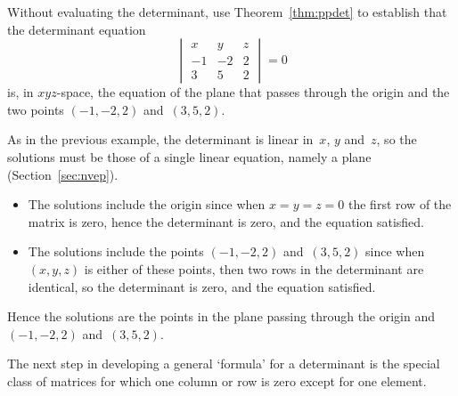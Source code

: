 \begin{example} \label{eg:planeq}
Without evaluating the determinant, use Theorem~\ref{thm:ppdet} to establish that the determinant equation
\begin{equation*}
\begin{vmatrix} x&y&z\\-1&-2&2\\3&5&2 \end{vmatrix}=0
\end{equation*}
is, in \(xyz\)-space, the equation of the plane that passes through the origin and the two points \((-1,-2,2)\) and~\((3,5,2)\).
\begin{solution} 
As in the previous example, the determinant is linear in~\(x\), \(y\) and~\(z\), so the solutions must be those of a single linear equation, namely a plane (Section~\ref{sec:nvep}).
\begin{itemize}
\item The solutions include the origin since when \(x=y=z=0\) the first row of the matrix is zero, hence the determinant is zero, and the equation satisfied.
\item The solutions include the  points \((-1,-2,2)\) and~\((3,5,2)\) since when \((x,y,z)\) is either of these points, then two rows in the determinant are identical, so the determinant is zero, and the equation satisfied.
\end{itemize}
Hence the solutions are the points in the plane passing through the origin and \((-1,-2,2)\) and~\((3,5,2)\).
\end{solution}
\end{example}






The next step in developing a general `formula' for a determinant is the special class of matrices for which one column or row is zero except for one element.



